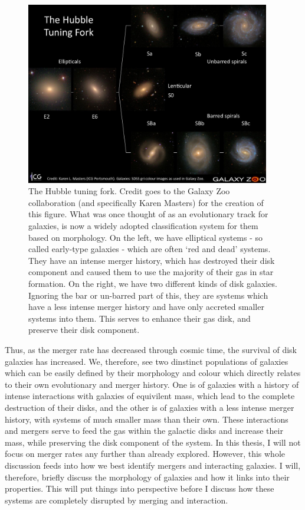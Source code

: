 \begin{figure}
    \centering
    \includegraphics[width=0.95\textwidth]{Introduction/figures/hubble-tuning-fork.jpg}
    \caption{The Hubble tuning fork. Credit goes to the Galaxy Zoo collaboration (and specifically Karen Masters) for the creation of this figure. What was once thought of as an evolutionary track for galaxies, is now a widely adopted classification system for them based on morphology. On the left, we have elliptical systems - so called early-type galaxies - which are often `red and dead' systems. They have an intense merger history, which has destroyed their disk component and caused them to use the majority of their gas in star formation. On the right, we have two different kinds of disk galaxies. Ignoring the bar or un-barred part of this, they are systems which have a less intense merger history and have only accreted smaller systems into them. This serves to enhance their gas disk, and preserve their disk component.}
    \label{fig:hubble-tuning}
\end{figure}

Thus, as the merger rate has decreased through cosmic time, the survival of disk galaxies has increased. We, therefore, see two dinstinct populations of galaxies which can be easily defined by their morphology and colour which directly relates to their own evolutionary and merger history. One is of galaxies with a history of intense interactions with galaxies of equivilent mass, which lead to the complete destruction of their disks, and the other is of galaxies with a less intense merger history, with systems of much smaller mass than their own. These interactions and mergers serve to feed the gas within the galactic disks and increase their mass, while preserving the disk component of the system. In this thesis, I will not focus on merger rates any further than already explored. However, this whole discussion feeds into how we best identify mergers and interacting galaxies. I will, therefore, briefly discuss the morphology of galaxies and how it links into their properties. This will put things into perspective before I discuss how these systems are completely disrupted by merging and interaction. 

